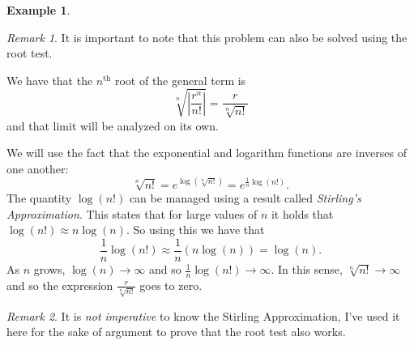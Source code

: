 \documentclass[12pt]{article}
\theoremstyle{plain}
\theoremstyle{definition}
\newtheorem{Ex}[Th]{Example}           %
\theoremstyle{remark}
\newtheorem*{Rmk}{Remark}      %
\renewcommand{\:}{\colon}           %
\renewcommand{\.}{\Cdot}                %
\begin{document}
\begin{multicols}{2}
\begin{Ex}
  \end{Ex}
\begin{Rmk}
  It is important to note that this problem can also be solved using the root test.\par 
  We have that the $n^{\text{th}}$ root of the general term is 
  $$\sqrt[n]{\left|\frac{r^n}{n!}\right|}=\frac{r}{\sqrt[n]{n!}}$$
  and that limit will be analyzed on its own.\par 
  We will use the fact that the exponential and logarithm functions are inverses of one another:
  $$\sqrt[n]{n!}=e^{\log(\sqrt[n]{n!})}=e^{\frac{1}{n}\log(n!)}.$$
  The quantity $\log(n!)$ can be managed using a result called \emph{Stirling's Approximation}. This states that for large values of $n$ it holds that $\log(n!)\approx n\log(n)$. So using this we have that 
  $$\frac{1}{n}\log(n!)\approx\frac{1}{n}(n\log(n))=\log(n).$$
  As $n$ grows, $\log(n)\to\infty$ and so $\frac{1}{n}\log(n!)\to\infty$. In this sense, $\sqrt[n]{n!}\to\infty$ and so the expression $\frac{r}{\sqrt[n]{n!}}$ goes to zero. 
\end{Rmk}

\begin{Rmk}
  It is \emph{not imperative} to know the Stirling Approximation, I've used it here for the sake of argument to prove that the root test also works.
\end{Rmk}


\end{multicols}
\end{document}
